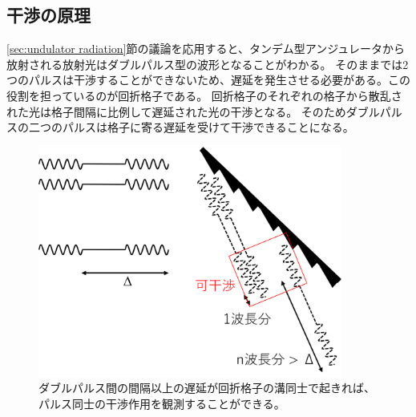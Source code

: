 \documentclass[a4paper,11pt,uplatex]{jsbook}
\begin{document}
\subsection{干渉の原理}\label{sec:interference}
\ref{sec:undulator radiation}節の議論を応用すると、タンデム型アンジュレータから放射される放射光はダブルパルス型の波形となることがわかる。
そのままでは2つのパルスは干渉することができないため、遅延を発生させる必要がある。この役割を担っているのが回折格子である。
回折格子のそれぞれの格子から散乱された光は格子間隔に比例して遅延された光の干渉となる。
そのためダブルパルスの二つのパルスは格子に寄る遅延を受けて干渉できることになる。
\begin{figure}[b]
  \centering
  \includegraphics[width=10cm]{image/2-doublepulse.png}
  \caption[干渉の原理]{ダブルパルス間の間隔以上の遅延が回折格子の溝同士で起きれば、パルス同士の干渉作用を観測することができる。}
  \label{fig:doublepulse}
\end{figure}
\end{document}
